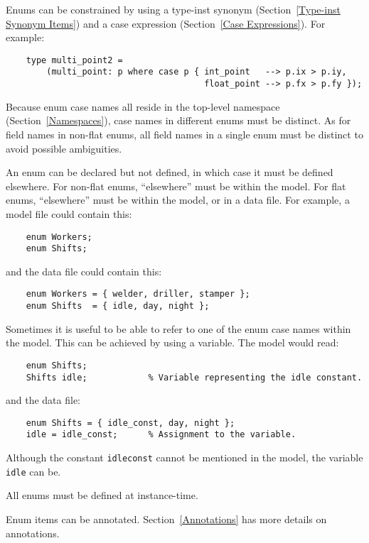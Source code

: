 \documentclass[10pt]{scrartcl}
\begin{document}
{Enums can be constrained by using a type-inst synonym
(Section~\ref{Type-inst Synonym Items}) and a case expression
(Section~\ref{Case Expressions}).  For example:
\begin{verbatim}
    type multi_point2 =
        (multi_point: p where case p { int_point   --> p.ix > p.iy,
                                       float_point --> p.fx > p.fy });
\end{verbatim}

Because enum case names all reside in the top-level namespace
(Section~\ref{Namespaces}), case names in different enums must be distinct.
As for field names in non-flat enums, all field names in a single enum must
be distinct to avoid possible ambiguities.

An enum can be declared but not defined, in which case it must be defined
elsewhere.  For non-flat enums, ``elsewhere'' must be within the model.
For flat enums, ``elsewhere'' must be within the model, or in a data file.
For example, a model file could contain this:
\begin{verbatim}
    enum Workers;
    enum Shifts;
\end{verbatim}
and the data file could contain this:
\begin{verbatim}
    enum Workers = { welder, driller, stamper };
    enum Shifts  = { idle, day, night };
\end{verbatim}
Sometimes it is useful to be able to refer to one of the enum case names
within the model.  This can be achieved by using a variable.  The model
would read:
\begin{verbatim}
    enum Shifts;
    Shifts idle;            % Variable representing the idle constant.
\end{verbatim}
and the data file:
\begin{verbatim}
    enum Shifts = { idle_const, day, night };
    idle = idle_const;      % Assignment to the variable.
\end{verbatim}
Although the constant \texttt{idle\n{}const} cannot be mentioned in the
model, the variable \texttt{idle} can be.

All enums must be defined at instance-time.

Enum items can be annotated.
Section~\ref{Annotations} has more details on annotations.

}
\end{document}
